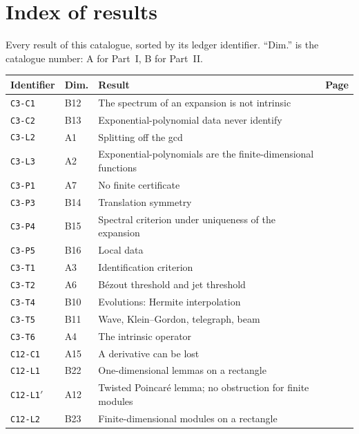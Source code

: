 \chapter{Index of results}\label{app:index}
Every result of this catalogue, sorted by its ledger identifier. ``Dim.'' is the catalogue number: A for Part~I, B for Part~II.

\begin{center}\small
\begin{longtable}{@{}L{3.0cm}L{1.2cm}L{8.4cm}L{1.2cm}@{}}
\toprule
Identifier & Dim. & Result & Page\\\midrule\endhead
\texttt{C3-C1} & B12 & The spectrum of an expansion is not intrinsic & \pageref{dim:C3-C1}\\
\texttt{C3-C2} & B13 & Exponential-polynomial data never identify & \pageref{dim:C3-C2}\\
\texttt{C3-L2} & A1 & Splitting off the gcd & \pageref{dim:C3-L2}\\
\texttt{C3-L3} & A2 & Exponential-polynomials are the finite-dimensional functions & \pageref{dim:C3-L3}\\
\texttt{C3-P1} & A7 & No finite certificate & \pageref{dim:C3-P1}\\
\texttt{C3-P3} & B14 & Translation symmetry & \pageref{dim:C3-P3}\\
\texttt{C3-P4} & B15 & Spectral criterion under uniqueness of the expansion & \pageref{dim:C3-P4}\\
\texttt{C3-P5} & B16 & Local data & \pageref{dim:C3-P5}\\
\texttt{C3-T1} & A3 & Identification criterion & \pageref{dim:C3-T1}\\
\texttt{C3-T2} & A6 & B\'ezout threshold and jet threshold & \pageref{dim:C3-T2}\\
\texttt{C3-T4} & B10 & Evolutions: Hermite interpolation & \pageref{dim:C3-T4}\\
\texttt{C3-T5} & B11 & Wave, Klein--Gordon, telegraph, beam & \pageref{dim:C3-T5}\\
\texttt{C3-T6} & A4 & The intrinsic operator & \pageref{dim:C3-T6}\\
\texttt{C12-C1} & A15 & A derivative can be lost & \pageref{dim:C12-C1}\\
\texttt{C12-L1} & B22 & One-dimensional lemmas on a rectangle & \pageref{dim:C12-L1}\\
\texttt{C12-L1$'$} & A12 & Twisted Poincar\'e lemma; no obstruction for finite modules & \pageref{dim:C12-L1'}\\
\texttt{C12-L2} & B23 & Finite-dimensional modules on a rectangle & \pageref{dim:C12-L2}\\

\end{longtable}
\end{center}
